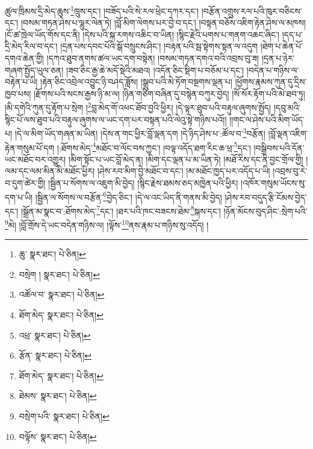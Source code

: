 ཚུལ་ཁྲིམས་དྲི་མེད་ཆུས་\footnote{ཆུ་  སྣར་ཐང་།  པེ་ཅིན། }ཁྲུས་དང་། །བཟོད་པའི་སེ་རལ་ཕྲེང་དཀར་དང་། །བརྩོན་འགྲུས་རལ་པའི་ཁུར་བཅིངས་དང་། །བསམ་གཏན་ཤེས་པ་ལྷུར་ལེན་ཏེ། །བློ་མིག་ལེགས་པར་བྱེ་བ་དང་། །བསྟན་བཅོས་འཇིག་རྟེན་ཤེས་ལ་མཁས། །ངོ་ཚ་ཁྲེལ་ཡོད་གོས་དང་ནི། །དེས་པའི་སྐ་རགས་འཆིང་བ་ཡིན། །སྙིང་རྗེའི་པགས་པ་གནག་འཆང་ཞིང་། །དད་པ་དྲི་མེད་རིལ་བ་དང་། །དྲན་པས་དབང་པོའི་སྒོ་བསྲུངས་ཤིང་། །བརྟན་པའི་སྦ་སྟེགས་སྟན་ལ་འདུག །ཐེག་པ་ཆེན་པོ་དགའ་ཆེན་གྱི། །དཀའ་ཐུབ་ནགས་ཚལ་ཡང་དག་བསྟེན། །བསམ་གཏན་དགའ་བའི་འབྲས་བུ་ཟ། །དྲན་པ་ཉེར་གཞག་སྤྱོད་ཡུལ་ཅན། །ཟབ་ཅིང་རྒྱ་ཆེ་མདོ་སྡེའི་མཐའ། །འདོན་ཅིང་སྡིག་པ་བཅོམ་པ་དང་། །བདེན་པ་གཉིས་ལ་བརྟེན་པ་ཡི། །རྟེན་ཅིང་འབྲེལ་འབྱུང་ཉི་བཤད་ཟློས། །སྒྲུབ་པའི་མེ་ཏོག་བསྔགས་ལྡན་པ། །ཕྱོགས་རྣམས་ཀུན་དུ་དྲིས་ཁྱབ་པས། །རྫོགས་པའི་སངས་རྒྱས་ཉི་མ་ལ། །ཉིན་གཅིག་བཞིན་དུ་བསྙེན་བཀུར་བྱེད། །སོ་སོར་རྟོག་པའི་མེ་ཐབ་ཏུ། །མི་དགེའི་ཀུན་དུ་རྟོག་པ་སྲེག །\footnote{བསྲེག །  སྣར་ཐང་།  པེ་ཅིན། }བླ་མེད་གོ་འཕང་ཐོབ་བྱའི་ཕྱིར། །དེ་ལྟར་ཐུབ་པའི་བརྟུལ་ཞུགས་སྤྱོད། །དབུ་མའི་སྙིང་པོ་ལས་ཐུབ་པའི་བརྟུལ་ཞུགས་ལ་ཡང་དག་པར་བསྟན་པའི་ལེའུ་སྟེ་གཉིས་པའོ།། །།གང་ལ་ཤེས་པའི་མིག་ཡོད་པ། །དེ་ལ་མིག་ཡོད་གཞན་མ་ཡིན། །དེས་ན་གང་ཕྱིར་བློ་ལྡན་དག །དེ་ཉིད་ཤེས་པ་:ཚོལ་བ་\footnote{འཚོལ་བ་  སྣར་ཐང་།  པེ་ཅིན། }བརྩོན། །བློ་ལྡན་འཇིག་རྟེན་གསུམ་པོ་དག །:ཐོགས་མེད་\footnote{ཐོག་མེད་  སྣར་ཐང་།  པེ་ཅིན། }མཐོང་བ་ལོང་བས་ཀྱང་། །བལྟ་འདོད་ཐག་རིང་ཆ་ཕྲ་\footnote{འཕྲ་  སྣར་ཐང་།  པེ་ཅིན། }དང་། །བསྒྲིབས་པའི་དོན་ཡང་མཐོང་བར་འགྱུར། །མིག་སྟོང་པ་ཡང་བློ་མེད་ན། །མིག་དང་ལྡན་པ་མ་ཡིན་ཏེ། །མཐོ་རིས་དང་ནི་བྱང་གྲོལ་གྱི། །ལམ་དང་ལམ་མིན་མི་མཐོང་ཕྱིར། །ཤེས་རབ་མིག་བྱེ་མཐོང་བ་དང་། །མ་མཐོང་ཁྱད་པར་འདོད་པ་ཡི། །འབྲས་བུ་རེ་བ་དུག་ཚེར་གྱི། །སྦྱིན་པ་སོགས་ལ་འཇུག་མི་བྱེད། །སྙིང་རྗེས་ཐམས་ཅད་མཁྱེན་པའི་ཕྱིར། །འཁོར་གསུམ་ཡོངས་སུ་དག་པ་ཡི། །སྦྱིན་ལ་སོགས་ལ་བརྩོན་\footnote{རྩོན་  སྣར་ཐང་།  པེ་ཅིན། }བྱེད་ཅིང་། །དེ་ལ་འང་ཡིད་ནི་གནས་མི་བྱེད། །ཤེས་རབ་བདུད་རྩི་ངོམས་བྱེད་དང་། །སྒྲོན་མ་སྣང་བ་:ཐོགས་མེད་\footnote{ཐོག་མེད་  སྣར་ཐང་།  པེ་ཅིན། }དང་། །ཐར་པའི་ཁང་བཟངས་ཐེམ་\footnote{ཐེམས་  སྣར་ཐང་།  པེ་ཅིན། }སྐས་དང་། །ཉོན་མོངས་བུད་ཤིང་:སྲེག་པའི་\footnote{བསྲེག་པའི་  སྣར་ཐང་།  པེ་ཅིན། }མེ། །བློ་གྲོས་དེ་ཡང་བདེན་གཉིས་ལ། །ལྟོས་\footnote{བལྟོས་  སྣར་ཐང་།  པེ་ཅིན། }ནས་རྣམ་པ་གཉིས་སུ་འདོད། །
